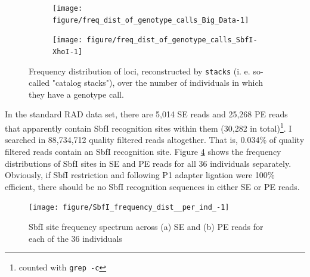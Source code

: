\documentclass[a4paper,12pt,times,print,index,custombib,custommargin]{PhDThesisPSnPDF}\usepackage[]{graphicx}\usepackage[]{color}
\newenvironment{knitrout}{}{} %
\begin{document}
\begin{figure}
\centering
\begin{subfigure}[t]{.495\textwidth}
\begin{knitrout}
\color{fgcolor}

{\centering \texttt{[image: figure/freq\_dist\_of\_genotype\_calls\_Big\_Data-1]} 

}



\end{knitrout}
\caption{}
\label{Big_Data:freq_dist_of_genotype_calls}
\end{subfigure}
\hfill
\begin{subfigure}[t]{.495\textwidth}
\begin{knitrout}
\color{fgcolor}

{\centering \texttt{[image: figure/freq\_dist\_of\_genotype\_calls\_SbfI-XhoI-1]} 

}



\end{knitrout}
\caption{}
\label{ddRAD:freq_dist_of_genotype_calls}
\end{subfigure}
\caption{Frequency distribution of loci, reconstructed by \texttt{stacks} (i. e. so-called "catalog stacks"), over the number of individuals in which they have a genotype call.}
\label{freq_dist_of_genotype_calls}
\end{figure}


In the standard RAD data set, there are 5,014 SE reads and 25,268 PE reads that apparently contain SbfI recognition sites within them (30,282 in total)\footnote{counted with \texttt{grep -c}}. I searched in 88,734,712 quality filtered reads altogether. That is, 0.034\% of quality filtered reads contain an SbfI recognition site. Figure \ref{SbfI_frequency_dist_per_ind} shows the frequency distributions of SbfI sites in SE and PE reads for all 36 individuals separately. Obviously, if SbfI restriction and following P1 adapter ligation were 100\% efficient, there should be no SbfI recognition sequences in either SE or PE reads. 

\begin{figure}[htb]
\centering
\begin{knitrout}
\color{fgcolor}

{\centering \texttt{[image: figure/SbfI\_frequency\_dist\_\_per\_ind\_-1]} 

}



\end{knitrout}
\caption{SbfI site frequency spectrum across (a) SE and (b) PE reads for each of the 36 individuals}
\label{SbfI_frequency_dist_per_ind}
\end{figure}
\end{document}
